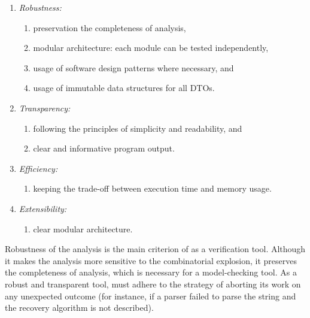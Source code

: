 \vspace{0.5em}
\begin{enumerate}[nolistsep]
  \item \textit{Robustness:}
    \begin{enumerate}[label*=\arabic*.]
      \item preservation the completeness of analysis,
      \item modular architecture: each module can be tested independently,
      \item usage of software design patterns where necessary, and
      \item usage of immutable data structures for all DTOs.
    \end{enumerate}
  \item \textit{Transparency:}
    \begin{enumerate}[label*=\arabic*.]
      \item following the principles of simplicity and readability, and
      \item clear and informative program output.
    \end{enumerate}
  \item \textit{Efficiency:}
    \begin{enumerate}[label*=\arabic*.]%
      \item keeping the trade-off between execution time and memory usage.
    \end{enumerate}
  \item \textit{Extensibility:}
    \begin{enumerate}[label*=\arabic*.]%
      \item clear modular architecture.
    \end{enumerate}
\end{enumerate}

Robustness of the analysis is the main criterion of \porthos[2] as a verification tool.
Although it makes the analysis more sensitive to the combinatorial explosion, it preserves the completeness of analysis, which is necessary for a model-checking tool.
As a robust and transparent tool, \porthos[2] must adhere to the strategy of aborting its work on any unexpected outcome (for instance, if a parser failed to parse the string and the recovery algorithm is not described).

